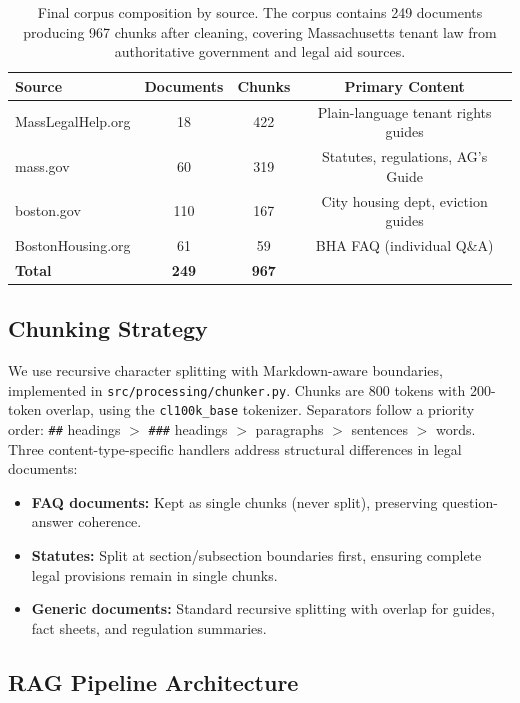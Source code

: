\documentclass{article}
\begin{document}
\begin{table}[t]
  \caption{Final corpus composition by source. The corpus contains 249 documents producing 967 chunks after cleaning, covering Massachusetts tenant law from authoritative government and legal aid sources.}
  \label{tab:corpus}
  \centering
  \begin{tabular}{lccc}
    \toprule
    Source & Documents & Chunks & Primary Content \\
    \midrule
    MassLegalHelp.org & 18 & 422 & Plain-language tenant rights guides \\
    mass.gov & 60 & 319 & Statutes, regulations, AG's Guide \\
    boston.gov & 110 & 167 & City housing dept, eviction guides \\
    BostonHousing.org & 61 & 59 & BHA FAQ (individual Q\&A) \\
    \midrule
    \textbf{Total} & \textbf{249} & \textbf{967} & \\
    \bottomrule
  \end{tabular}
\end{table}

\subsection{Chunking Strategy}

We use recursive character splitting with Markdown-aware boundaries, implemented in \texttt{src/processing/chunker.py}. Chunks are 800 tokens with 200-token overlap, using the \texttt{cl100k\_base} tokenizer. Separators follow a priority order: \texttt{\#\#} headings $>$ \texttt{\#\#\#} headings $>$ paragraphs $>$ sentences $>$ words. Three content-type-specific handlers address structural differences in legal documents:

\begin{itemize}
    \item \textbf{FAQ documents:} Kept as single chunks (never split), preserving question-answer coherence.
    \item \textbf{Statutes:} Split at section/subsection boundaries first, ensuring complete legal provisions remain in single chunks.
    \item \textbf{Generic documents:} Standard recursive splitting with overlap for guides, fact sheets, and regulation summaries.
\end{itemize}

\subsection{RAG Pipeline Architecture}
\end{document}
